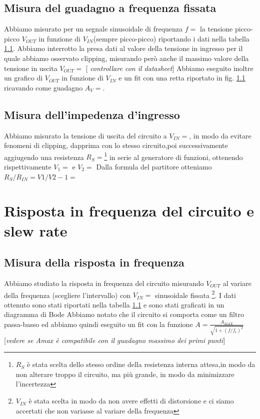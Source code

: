\documentclass[10pt,a4paper]{article}
\newcommand{\rem}[1]{[\emph{#1}]}
\begin{document}
\subsection{Misura del guadagno a frequenza fissata}
Abbiamo misurato per un segnale sinusoidale di frequenza $f=$ la tensione picco-picco $V_{OUT}$ in funzione di $V_{IN}$(sempre picco-picco) riportando i dati nella tabella \ref{}. Abbiamo interrotto la presa dati al valore della tensione in ingresso per il quale abbiamo osservato clipping, misurando però anche il massimo valore della tensione in uscita  $V_{OUT} = $ \rem{ controllare con il datasheet}
Abbiamo eseguito inoltre un grafico di $V_{OUT}$ in funzione di $V_{IN}$ e un fit con una retta riportato in fig. \ref{} ricavando come guadagno $A_V=$.

\subsection{Misura dell'impedenza d'ingresso}
Abbiamo misurato la tensione di uscita del circuito a $V_{IN}=$, in modo da evitare fenomeni di clipping, dapprima con lo stesso circuito,poi successivamente aggiugendo una resistenza $R_S=$\footnote{$R_S$ è stata scelta dello stesso ordine della resistenza interna attesa,in modo da non alterare troppo il circuito, ma più grande, in modo da minimizzare l'incertezza} in serie al generatore di funzioni, ottenendo rispettivamente $V_1=$ e $V_2=$ Dalla formula del partitore otteniamo $R_S/R_{IN}=V1/V2-1=$
\section{Risposta in frequenza del circuito e slew rate}
\subsection{Misura della risposta in frequenza}
Abbiamo studiato la risposta in frequenza del circuito misurando $V_{OUT}$ al variare della frequenza (scegliere l'intervallo) con $V_{IN}=$  sinusoidale fissata \footnote{$V_{IN}$ è stata scelta in modo da non avere effetti di distorsione e ci siamo accertati che non variasse al variare della frequenza}.
I dati ottenuto sono stati riportati nella tabella \ref{} e sono stati graficati in un diagramma di Bode
Abbiamo notato che il circuito si comporta come un filtro passa-basso ed abbiamo quindi  eseguito un fit con la funzione $ A=\frac{A_{MAX}}{\sqrt{1+(f/f_t)^2}}$
\rem{vedere se Amax è compatibile con il guadagno massimo dei primi punti}
\end{document}
